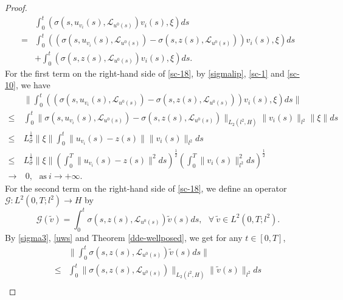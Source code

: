 \documentclass[10pt,a4paper]{amsart}
\def\leq{\leqslant}
\begin{document}
\begin{proof}
\begin{align}
        & \int_0^t \left( \sigma(s, u_{v_i}(s), \mathcal{L}_{u^0(s)} ) v_i(s), \xi \right) ds \nonumber \\
        = & \int_0^t
        \left(
        \left( \sigma(s, u_{v_i}(s), \mathcal{L}_{u^0(s)} ) - \sigma(s, z(s), \mathcal{L}_{u^0(s)} )
        \right) v_i(s),
        \xi
        \right) ds
        \nonumber \\
        & + \int_0^t
        \left( \sigma(s, z(s), \mathcal{L}_{u^0(s)} ) v_i(s), \xi \right) ds.
    \end{align}
    For the first term on the right-hand side of \eqref{sc-18},
    by \eqref{sigmalip}, \eqref{sc-1} and \eqref{sc-10},  we have
    \begin{align} \label{sc-19}
        & \| \int_0^t
        \left(
        \left( \sigma(s, u_{v_i}(s), \mathcal{L}_{u^0(s)} ) - \sigma(s, z(s), \mathcal{L}_{u^0(s)} )
        \right) v_i(s),
        \xi
        \right) ds
        \|
        \nonumber \\
        \leq & \int_0^t
        \| \sigma(s, u_{v_i}(s), \mathcal{L}_{u^0(s)} ) - \sigma(s, z(s), \mathcal{L}_{u^0(s)} ) \|_{L_2(l^2, H)}
        \| v_i(s) \|_{l^2}
        \|\xi\|
        ds
        \nonumber \\
        \leq & L_\sigma^{\frac{1}{2}}  \|\xi\|
        \int_0^t
        \| u_{v_i}(s) - z(s) \|
        \| v_i(s) \|_{l^2}
        ds
        \nonumber \\
        \leq & L_\sigma^{\frac{1}{2}}  \|\xi\|
        \left( \int_0^T
        \| u_{v_i}(s) - z(s) \|^2
        ds
        \right)^{\frac{1}{2}}
        \left( \int_0^T \| v_i(s) \|_{l^2}^2 ds
        \right)^{\frac{1}{2}}
        \nonumber \\
        \rightarrow & \  0, \ \ \  \text{as} \  i \to +\infty.
    \end{align}
    For the second term on the right-hand side of \eqref{sc-18},
    we define an operator $\mathcal{G}: L^2(0,T; l^2)  \rightarrow  H$ by
    $$\mathcal{G}(\tilde{v})
    = \int_0^t  \sigma(s, z(s), \mathcal{L}_{u^0(s)} ) \tilde{v}(s) ds, \ \ \
    \forall \  \tilde{v} \in L^2(0,T; l^2).
    $$
    By \eqref{sigma3}, \eqref{uws} and Theorem \ref{dde-wellposed},
    we get for any $t \in [0,T]$,
    \begin{align} \label{sc-20}
        & \| \int_0^t  \sigma(s, z(s), \mathcal{L}_{u^0(s)} ) \tilde{v}(s) ds \|  \nonumber \\
        \leq & \int_0^t \| \sigma(s, z(s), \mathcal{L}_{u^0(s)} ) \|_{L_2(l^2, H)}
        \| \tilde{v}(s) \|_{l^2}
        ds  \nonumber \\

\end{align}
\end{proof}
\end{document}
